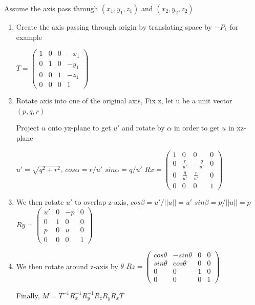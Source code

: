 \documentclass[12pt]{article}
\begin{document}
Assume the axis pass through $(x_1, y_1, z_1)$ and $(x_2, y_2, z_2)$
\begin{enumerate}[(1)]

\item
Create the axis passing through origin by translating space by $-P_1$ for example

$ T = \begin{pmatrix}
1 & 0 & 0 & -x_1\\
0 & 1 & 0 & -y_1\\
0 & 0 & 1 & -z_1\\
0 & 0 & 0 & 1
\end{pmatrix}$

\item
Rotate axis into one of the original axis, Fix z, let u be a unit vector $(p,q,r)$

Project $u$ onto yz-plane to get $u'$ and rotate by $\alpha$ in order to get $u$ in xz-plane

$u'=\sqrt{q^2+r^2}$, $cos\alpha = r/u' $ $sin\alpha = q/u'$
$ Rx = \begin{pmatrix}
1 & 0 & 0 & 0\\
0 & \frac{r}{u'} & -\frac{q}{u'} & 0\\
0 & \frac{q}{u'} & \frac{r}{u'} & 0\\
0 & 0 & 0 & 1
\end{pmatrix}$

\item
We then rotate $u'$ to overlap z-axis, $cos\beta = u'/||u|| = u'$ $sin\beta = p/||u|| = p $
$ Ry = \begin{pmatrix}
u' & 0 & -p & 0\\
0 & 1 & 0 & 0\\
p & 0 & u & 0\\
0 & 0 & 0 & 1
\end{pmatrix}$

\item
We then rotate around z-axis by $\theta$
$ Rz = \begin{pmatrix}
cos\theta & -sin\theta & 0 & 0\\
sin\theta & cos\theta & 0 & 0\\
0 & 0 & 1 & 0\\
0 & 0 & 0 & 1
\end{pmatrix}$

Finally, $M=T^{-1}R_x^{-1}R_y^{-1}R_zR_yR_xT$
\end{enumerate}



\end{document}
